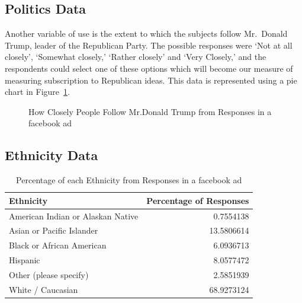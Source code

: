 \documentclass[
  letterpaper,
  DIV=11,
  numbers=noendperiod]{scrartcl}
\begin{document}
\subsection{Politics Data}\label{sec-pol_data}

Another variable of use is the extent to which the subjects follow
Mr.~Donald Trump, leader of the Republican Party. The possible responses
were `Not at all closely', `Somewhat closely,' `Rather closely' and
`Very Closely,' and the respondents could select one of these options
which will become our measure of measuring subscription to Republican
ideas. This data is represented using a pie chart in
Figure~\ref{fig-figure2}.

\begin{figure}


\caption{\label{fig-figure2}How Closely People Follow Mr.Donald Trump
from Responses in a facebook ad}

\end{figure}%

\subsection{Ethnicity Data}\label{sec-race_data}

\begin{longtable}[]{@{}lr@{}}

\caption{\label{tbl-race\_dist}Percentage of each Ethnicity from
Responses in a facebook ad}

\tabularnewline

\toprule\noalign{}
Ethnicity & Percentage of Responses \\
\midrule\noalign{}
\endhead
\bottomrule\noalign{}
\endlastfoot
American Indian or Alaskan Native & 0.7554138 \\
Asian or Pacific Islander & 13.5806614 \\
Black or African American & 6.0936713 \\
Hispanic & 8.0577472 \\
Other (please specify) & 2.5851939 \\
White / Caucasian & 68.9273124 \\

\end{longtable}
\end{document}
